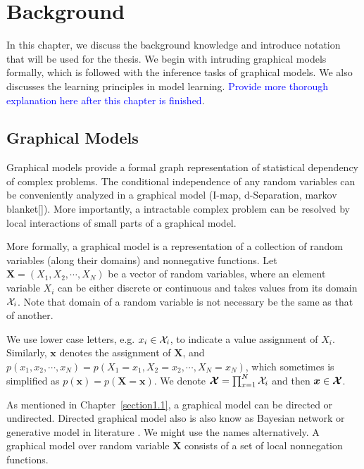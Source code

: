\chapter{Background}
\label{chapter2}
In this chapter, we discuss the background knowledge and introduce notation that will be used for the thesis. We begin with intruding graphical models formally, which is followed with the inference tasks of graphical models. We also discusses the learning principles in model learning. \textcolor{blue}{Provide more thorough explanation here after this chapter is finished}.

\section{Graphical Models}
Graphical models provide a formal graph representation of statistical dependency of complex problems. The conditional independence of any random variables can be conveniently analyzed in a graphical model (I-map, d-Separation, markov blanket[]). More importantly, a intractable complex problem can be resolved by local interactions of small parts of a graphical model.

More formally, a graphical model is a representation of a collection of random variables (along their domains) and nonnegative functions. Let $\bm{X}= (X_1, X_2, \cdots, X_N)$ be a vector of random variables, where an element variable $X_i$ can be either discrete or continuous and takes values from its domain $\mathcal{X}_i$. Note that domain of a random variable is not necessary be the same as that of another.

We use lower case letters, e.g. $x_i \in \mathcal{X}_i$, to indicate a value assignment of $X_i$. Similarly, $\bm{x}$ denotes the assignment of $\bm{X}$, and $  p(x_1, x_2, \cdots, x_N) = p(X_1 = x_1, X_2 = x_2, \cdots, X_N = x_N)$,
which sometimes is simplified as $p(\bm{x})=p(\bm{X}=\bm{x})$. We denote $\bm{\mathcal{X}} = \prod_{x=1}^{N} \mathcal{X}_i$ and then $\bm{x}\in \bm{\mathcal{X}}$.

As mentioned in Chapter~\ref{section1.1}, a graphical model can be directed or undirected. Directed graphical model also is also know as Bayesian network or generative model in literature \cite[Chapter~8]{Bishop:2006:PRM:1162264}. We might use the names alternatively.
A graphical model over random variable $\bm{X}$ consists of a set of local nonnegation functions.

